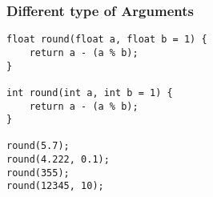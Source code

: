 \begin{frame}[fragile]
    \frametitle{Different type of Arguments}
    \begin{lstlisting}
float round(float a, float b = 1) {
    return a - (a % b);
}

int round(int a, int b = 1) {
    return a - (a % b);
}

round(5.7);
round(4.222, 0.1);
round(355);
round(12345, 10);
    \end{lstlisting}
\end{frame}


